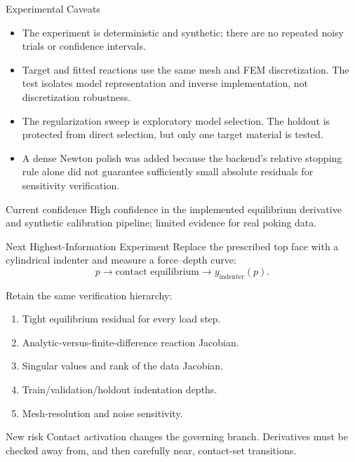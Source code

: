 \documentclass[aspectratio=169,10pt]{beamer}
\begin{document}
\begin{frame}{Experimental Caveats}
  \small
  \begin{itemize}
    \item The experiment is deterministic and synthetic; there are no
      repeated noisy trials or confidence intervals.
    \item Target and fitted reactions use the same mesh and FEM
      discretization. The test isolates model representation and inverse
      implementation, not discretization robustness.
    \item The regularization sweep is exploratory model selection. The
      holdout is protected from direct selection, but only one target
      material is tested.
    \item A dense Newton polish was added because the backend's relative
      stopping rule alone did not guarantee sufficiently small absolute
      residuals for sensitivity verification.
  \end{itemize}

  \begin{block}{Current confidence}
    High confidence in the implemented equilibrium derivative and synthetic
    calibration pipeline; limited evidence for real poking data.
  \end{block}
\end{frame}

\begin{frame}{Next Highest-Information Experiment}
  \small
  Replace the prescribed top face with a cylindrical indenter and measure a
  force--depth curve:
  \[
    p
    \longrightarrow
    \text{contact equilibrium}
    \longrightarrow
    y_{\mathrm{indenter}}(p).
  \]

  Retain the same verification hierarchy:
  \begin{enumerate}
    \item Tight equilibrium residual for every load step.
    \item Analytic-versus-finite-difference reaction Jacobian.
    \item Singular values and rank of the data Jacobian.
    \item Train/validation/holdout indentation depths.
    \item Mesh-resolution and noise sensitivity.
  \end{enumerate}

  \begin{alertblock}{New risk}
    Contact activation changes the governing branch. Derivatives must be
    checked away from, and then carefully near, contact-set transitions.
  \end{alertblock}
\end{frame}
\end{document}
